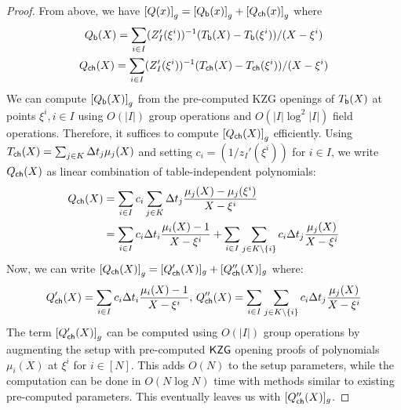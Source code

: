\begin{proof}
    From above, we have $\left[{Q(x)}\right]_g=\left[{Q_{\mathsf{b}}({x})}\right]_g+\left[{Q_{\mathsf{ch}}({x})}\right]_g$ where
    \begin{gather*}
        Q_{\mathsf{b}}({X})=\sum_{i\in I}(Z_I'(\xi^i))^{-1} (T_{\mathsf{b}}({X})-T_{\mathsf{b}}({\xi^i}))/(X-\xi^i) \\
        Q_{\mathsf{ch}}({X})=\sum_{i\in I}(Z_I'(\xi^i))^{-1} (T_{\mathsf{ch}}({X})-T_{\mathsf{ch}}({\xi^i}))/(X-\xi^i)
    \end{gather*}
    We can compute
    $\left[{Q_{\mathsf{b}}({X})}\right]_g$ from the pre-computed KZG openings of $T_{\mathsf{b}}({X})$ at points $\xi^i,i\in I$ using $O(|I|)$ group operations and
    $O(|I|\log^2 |I|)$ field operations. Therefore, it suffices to compute $\left[{Q_{\mathsf{ch}}({X})}\right]_g$ efficiently.
    Using $T_{\mathsf{ch}}({X})=\sum_{j\in K}\Delta t_j\mu_j(X)$ and setting $c_i=(1/z_I'(\xi^i))$ for $i\in I$,
    we write $Q_{\mathsf{ch}}({X})$ as linear combination of table-independent polynomials:
    \begin{align*}
        Q_{\mathsf{ch}}({X}) &= \sum_{i\in I} c_i\sum_{j\in K} \Delta t_j\frac{\mu_j(X)-\mu_j(\xi^i)}{X-\xi^i} \\
        &= \sum_{i\in I} c_i\Delta t_i\frac{\mu_i(X) - 1}{X-\xi^i} + \sum_{i\in I}\sum_{j\in K\setminus\{i\}}c_i\Delta t_j\frac{\mu_j(X)}{X-\xi^i}
    \end{align*}
    Now, we can write $\left[{Q_{\mathsf{ch}}({X})}\right]_g=[Q'_{\mathsf{ch}}({X})]_g + [Q''_{\mathsf{ch}}({X})]_g$ where:
        {\small
    \begin{gather*}
        Q'_{\mathsf{ch}}({X})=\sum_{i\in I}c_i\Delta t_i\frac{\mu_i(X)-1}{X-\xi^i},\,
        Q''_{\mathsf{ch}}({X})=\sum_{i\in I}\sum_{j\in K\setminus \{i\}} c_i\Delta t_j\frac{\mu_j(X)}{X-\xi^i}
    \end{gather*}
    }
    The term $\left[{Q'_{\mathsf{ch}}({X})}\right]_g$ can be computed using $O(|I|)$ group operations by augmenting the setup with pre-computed
    $\mathsf{KZG}$ opening proofs of polynomials $\mu_i(X)$ at $\xi^i$ for $i\in [N]$. This adds $O(N)$ to the setup parameters, while the computation
    can be done in $O(N\log N)$ time with methods similar to existing pre-computed parameters. This eventually leaves us with $[Q''_{\mathsf{ch}}({X})]_g$.

\end{proof}
